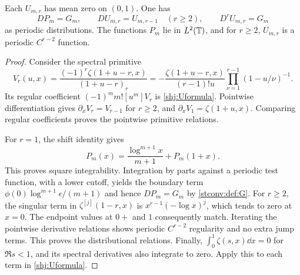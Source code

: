 \begin{lemma}\label{shj:Ulemma}
Each $U_{m,r}$ has mean zero on $(0,1)$. One has
\[
DP_m=G_m,\qquad DU_{m,r}=U_{m,r-1}\quad(r\ge2),\qquad D^rU_{m,r}=G_m
\]
as periodic distributions. The functions $P_m$ lie in $L^2(\mathbb T)$, and for $r\ge2$, $U_{m,r}$ is a periodic $C^{r-2}$ function.
\end{lemma}
\begin{proof}
Consider the spectral primitive
\begin{equation}\label{shj:primitivegenerator}
V_r(u,x)=\frac{(-1)^r\zeta(1+u-r,x)}{(1+u-r)_r}
=-\frac{\zeta(1+u-r,x)}{(r-1)!u}
\prod_{\nu=1}^{r-1}(1-u/\nu)^{-1}.
\end{equation}
Its regular coefficient $(-1)^m m![u^m]V_r$ is \eqref{shj:Uformula}. Pointwise differentiation gives $\partial_xV_r=V_{r-1}$ for $r\ge2$, and $\partial_xV_1=\zeta(1+u,x)$. Comparing regular coefficients proves the pointwise primitive relations.

For $r=1$, the shift identity gives
\[
P_m(x)=\frac{\log^{m+1}x}{m+1}+P_m(1+x).
\]
This proves square integrability. Integration by parts against a periodic test function, with a lower cutoff, yields the boundary term $\phi(0)\log^{m+1}\epsilon/(m+1)$ and hence $DP_m=G_m$ by \eqref{stconv:def:G}.
For $r\ge2$, the singular term in $\zeta^{[j]}(1-r,x)$ is $x^{r-1}(-\log x)^j$, which tends to zero at $x=0$. The endpoint values at $0+$ and $1$ consequently match. Iterating the pointwise derivative relations shows periodic $C^{r-2}$ regularity and no extra jump terms. This proves the distributional relations. Finally, $\int_0^1\zeta(s,x)\dd x=0$ for $\Re s<1$, and its spectral derivatives also integrate to zero. Apply this to each term in \eqref{shj:Uformula}.
\end{proof}


